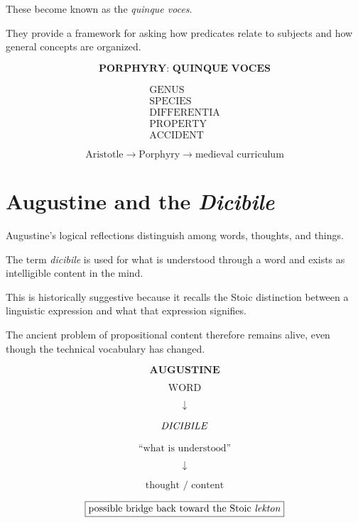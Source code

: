 \documentclass[11pt]{article}
\newcommand{\term}[1]{\textit{#1}}
\newcommand{\latin}[1]{\textit{#1}}
\begin{document}
These become known as the \latin{quinque voces}.

They provide a framework for asking how predicates relate to
subjects and how general concepts are organized.

\begin{whiteboard}
\[
\textbf{PORPHYRY: QUINQUE VOCES}
\]

\[
\begin{array}{c}
\text{GENUS}\\
\text{SPECIES}\\
\text{DIFFERENTIA}\\
\text{PROPERTY}\\
\text{ACCIDENT}
\end{array}
\]

\[
\text{Aristotle}
\longrightarrow
\text{Porphyry}
\longrightarrow
\text{medieval curriculum}
\]
\end{whiteboard}

\section{Augustine and the \textit{Dicibile}}

Augustine's logical reflections distinguish among words, thoughts,
and things.

The term \latin{dicibile} is used for what is understood through
a word and exists as intelligible content in the mind.

This is historically suggestive because it recalls the Stoic
distinction between a linguistic expression and what that
expression signifies.

The ancient problem of propositional content therefore remains
alive, even though the technical vocabulary has changed.

\begin{whiteboard}
\[
\textbf{AUGUSTINE}
\]

\[
\text{WORD}
\]

\[
\downarrow
\]

\[
\text{\latin{DICIBILE}}
\]

\[
\text{``what is understood''}
\]

\[
\downarrow
\]

\[
\text{thought / content}
\]

\[
\boxed{\text{possible bridge back toward the Stoic \term{lekton}}}
\]
\end{whiteboard}
\end{document}
